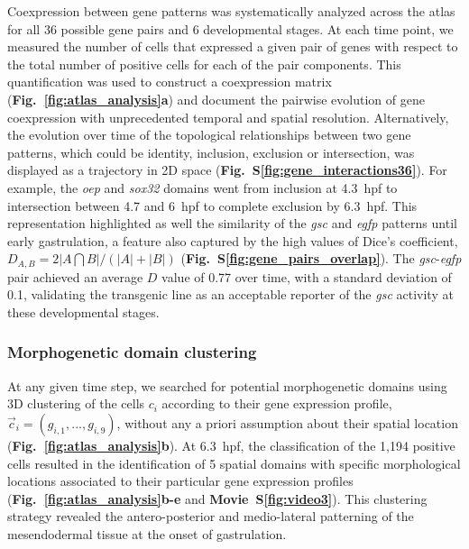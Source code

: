 Coexpression between gene patterns was systematically analyzed across the atlas for all 36 possible gene pairs and 6 developmental stages. At each time point, we measured the number of cells that expressed a given pair of genes with respect to the total number of positive cells for each of the pair components. This quantification was used to construct a coexpression matrix (\textbf{Fig.~\ref{fig:atlas_analysis}a}) and document the pairwise evolution of gene coexpression with unprecedented temporal and spatial resolution. Alternatively, the evolution over time of the topological relationships between two gene patterns, which could be identity, inclusion, exclusion or intersection, was displayed as a trajectory in 2D space (\textbf{Fig.~S\ref{fig:gene_interactions36}}). For example, the \emph{oep} and \emph{sox32} domains went from inclusion at 4.3~hpf to intersection between 4.7 and 6~hpf to complete exclusion by 6.3~hpf. This representation highlighted as well the similarity of the \emph{gsc} and \emph{egfp} patterns until early gastrulation, a feature also captured by the high values of Dice's coefficient, $D_{A,B}=2|A\bigcap B|/(|A|+|B|)$ (\textbf{Fig.~S\ref{fig:gene_pairs_overlap}}). The \emph{gsc}-\emph{egfp} pair achieved an average $D$ value of 0.77 over time, with a standard deviation of 0.1, validating the transgenic line as an acceptable reporter of the \emph{gsc} activity at these developmental stages.



\subsubsection*{Morphogenetic domain clustering}



At any given time step, we searched for potential morphogenetic domains using 3D clustering of the cells $c_i$ according to their gene expression profile, $\vec{c}_i = (g_{i,1}, ..., g_{i,9})$, without any a priori assumption about their spatial location (\textbf{Fig.~\ref{fig:atlas_analysis}b}). At 6.3~hpf, the classification of the 1,194 positive cells resulted in the identification of 5 spatial domains with specific morphological locations associated to their particular gene expression profiles (\textbf{Fig.~\ref{fig:atlas_analysis}b-e} and \textbf{Movie~S\ref{fig:video3}}). This clustering strategy revealed the antero-posterior and medio-lateral patterning of the mesendodermal tissue at the onset of gastrulation.



